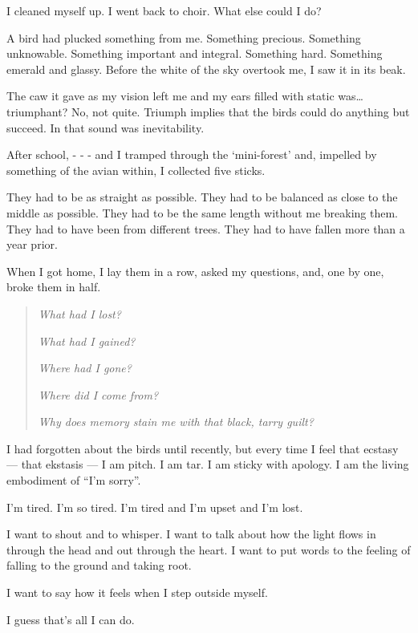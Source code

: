 I cleaned myself up. I went back to choir. What else could I do?

A bird had plucked something from me. Something precious. Something unknowable. Something important and integral. Something hard. Something emerald and glassy. Before the white of the sky overtook me, I saw it in its beak.

The caw it gave as my vision left me and my ears filled with static was\ldots{}triumphant? No, not quite. Triumph implies that the birds could do anything but succeed. In that sound was inevitability.

After school, - - - and I tramped through the `mini-forest' and, impelled by something of the avian within, I collected five sticks.

They had to be as straight as possible.
They had to be balanced as close to the middle as possible.
They had to be the same length without me breaking them.
They had to have been from different trees.
They had to have fallen more than a year prior.

When I got home, I lay them in a row, asked my questions, and, one by one, broke them in half.

\begin{quotation}
\emph{What had I lost?}

\emph{What had I gained?}

\emph{Where had I gone?}

\emph{Where did I come from?}

\emph{Why does memory stain me with that black, tarry guilt?}
\end{quotation}

I had forgotten about the birds until recently, but every time I feel that ecstasy --- that ekstasis --- I am pitch. I am tar. I am sticky with apology. I am the living embodiment of ``I'm sorry''.
\newpage

\noindent I'm tired. I'm so tired. I'm tired and I'm upset and I'm lost.


\noindent I want to shout and to whisper. I want to talk about how the light flows in through the head and out through the heart. I want to put words to the feeling of falling to the ground and taking root.

I want to say how it feels when I step outside myself.


\noindent I guess that's all I can do.

